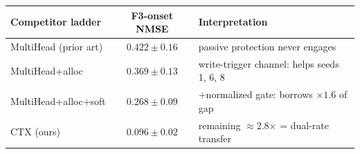 \begin{tabular}{lcl}
\toprule
Competitor ladder & F3-onset NMSE & Interpretation \\
\midrule
MultiHead (prior art) & $0.422\pm0.16$ & passive protection never engages \\
MultiHead+alloc & $0.369\pm0.13$ & write-trigger channel: helps seeds 1, 6, 8 \\
MultiHead+alloc+soft & $0.268\pm0.09$ & +normalized gate: borrows $\times1.6$ of gap \\
CTX (ours) & $\mathbf{0.096\pm0.02}$ & remaining $\approx$2.8$\times$ = dual-rate transfer \\
\bottomrule
\end{tabular}